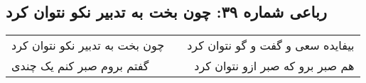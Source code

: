 \begin{center}
\section*{رباعی شماره ۳۹: چون بخت به تدبیر نکو نتوان کرد}
\label{sec:039}
\begin{longtable}{l p{0.5cm} r}
چون بخت به تدبیر نکو نتوان کرد
&&
بیفایده سعی و گفت و گو نتوان کرد
\\
گفتم بروم صبر کنم یک چندی
&&
هم صبر برو که صبر ازو نتوان کرد
\\
\end{longtable}
\end{center}
